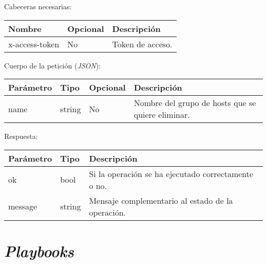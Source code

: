 Cabeceras necesarias:
\begin{table}[h!]
	\centering
	\begin{adjustbox}{max width=\textwidth}
	\begin{tabular}{|l|l|l|}
		\hline
		Nombre & Opcional & Descripción \\ \hline
		x-access-token & No & Token de acceso. \\ \hline
	\end{tabular}
\end{adjustbox}
\end{table}

Cuerpo de la petición (\textit{JSON}):
\begin{table}[h!]
	\centering
	\begin{adjustbox}{max width=\textwidth}
	\begin{tabular}{|l|l|l|l|}
		\hline
		Parámetro & Tipo & Opcional & Descripción \\ \hline
		name & string & No & Nombre del grupo de hosts que se quiere eliminar. \\ \hline
	\end{tabular}
\end{adjustbox}
\end{table}


\pagebreak
Respuesta:
\begin{table}[h!]
	\centering
	\begin{adjustbox}{max width=\textwidth}
	\begin{tabular}{|l|l|l|}
		\hline
		Parámetro & Tipo & Descripción \\ \hline
		ok & bool & Si la operación se ha ejecutado correctamente o no. \\ \hline
		message & string & Mensaje complementario al estado de la operación. \\ \hline
	\end{tabular}
\end{adjustbox}
\end{table}







\section{\textit{Playbooks}}

